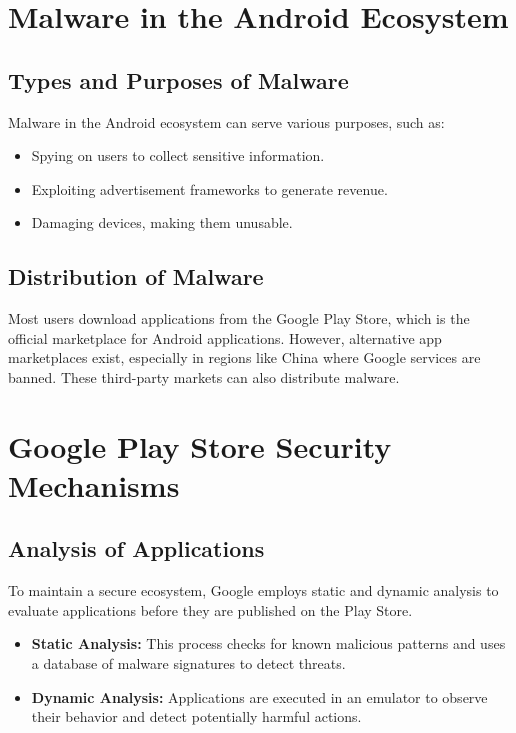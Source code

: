 \documentclass{article}
\begin{document}
\section{Malware in the Android Ecosystem}

\subsection{Types and Purposes of Malware}
Malware in the Android ecosystem can serve various purposes, such as:
\begin{itemize}
    \item Spying on users to collect sensitive information.
    \item Exploiting advertisement frameworks to generate revenue.
    \item Damaging devices, making them unusable.
\end{itemize}

\subsection{Distribution of Malware}
Most users download applications from the Google Play Store, which is the official marketplace for Android applications. However, alternative app marketplaces exist, especially in regions like China where Google services are banned. These third-party markets can also distribute malware.

\section{Google Play Store Security Mechanisms}

\subsection{Analysis of Applications}
To maintain a secure ecosystem, Google employs static and dynamic analysis to evaluate applications before they are published on the Play Store.
\begin{itemize}
    \item \textbf{Static Analysis:} This process checks for known malicious patterns and uses a database of malware signatures to detect threats.
    \item \textbf{Dynamic Analysis:} Applications are executed in an emulator to observe their behavior and detect potentially harmful actions.
\end{itemize}
\end{document}
